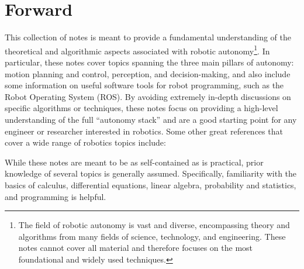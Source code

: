 \section*{Forward}
This collection of notes is meant to provide a fundamental understanding of the theoretical and algorithmic aspects associated with robotic autonomy\footnote{The field of robotic autonomy is vast and diverse, encompassing theory and algorithms from many fields of science, technology, and engineering. These notes cannot cover all material and therefore focuses on the most foundational and widely used techniques.}. In particular, these notes cover topics spanning the three main pillars of autonomy: motion planning and control, perception, and decision-making, and also include some information on useful software tools for robot programming, such as the Robot Operating System (ROS). By avoiding extremely in-depth discussions on specific algorithms or techniques, these notes focus on providing a high-level understanding of the full ``autonomy stack'' and are a good starting point for any engineer or researcher interested in robotics. Some other great references that cover a wide range of robotics topics include:

\vspace{\baselineskip}


\vspace{\baselineskip}


\vspace{\baselineskip}

While these notes are meant to be as self-contained as is practical, prior knowledge of several topics is generally assumed. Specifically, familiarity with the basics of calculus, differential equations, linear algebra, probability and statistics, and programming is helpful.

